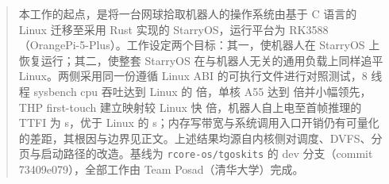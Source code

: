 \begin{abstract}
本工作的起点，是将一台网球拾取机器人的操作系统由基于 C 语言的 Linux 迁移至采用 Rust 实现的 StarryOS，运行平台为 RK3588（OrangePi-5-Plus）。工作设定两个目标：其一，使机器人在 StarryOS 上恢复运行；其二，使整套 StarryOS 在与机器人无关的通用负载上同样追平 Linux。两侧采用同一份遵循 Linux ABI 的可执行文件进行对照测试，8 线程 sysbench cpu 吞吐达到 Linux 的 \nCpuTEightRatio 倍，单核 A55 达到 \nAfiveRatio 倍并小幅领先，THP first-touch 建立映射较 Linux 快 \nThpRatio 倍，机器人自上电至首帧推理的 TTFI 为 \nTtfi s，优于 Linux 的 \nTtfiLin s；内存写带宽与系统调用入口开销仍有可量化的差距，其根因与边界见正文。上述结果均源自内核侧对调度、DVFS、分页与启动路径的改造。基线为 \texttt{rcore-os/tgoskits} 的 dev 分支（commit 73409e079），全部工作由 Team Posad（清华大学）完成。
\end{abstract}
